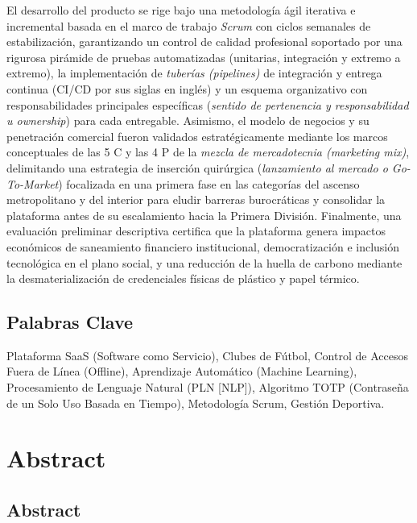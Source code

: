 El desarrollo del producto se rige bajo una metodología ágil iterativa e incremental basada en el marco de trabajo \textit{Scrum} con ciclos semanales de estabilización, garantizando un control de calidad profesional soportado por una rigurosa pirámide de pruebas automatizadas (unitarias, integración y extremo a extremo), la implementación de \textit{tuberías (pipelines)} de integración y entrega continua (CI/CD por sus siglas en inglés) y un esquema organizativo con responsabilidades principales específicas (\textit{sentido de pertenencia y responsabilidad u ownership}) para cada entregable. Asimismo, el modelo de negocios y su penetración comercial fueron validados estratégicamente mediante los marcos conceptuales de las 5 C y las 4 P de la \textit{mezcla de mercadotecnia (marketing mix)}, delimitando una estrategia de inserción quirúrgica (\textit{lanzamiento al mercado o Go-To-Market}) focalizada en una primera fase en las categorías del ascenso metropolitano y del interior para eludir barreras burocráticas y consolidar la plataforma antes de su escalamiento hacia la Primera División. Finalmente, una evaluación preliminar descriptiva certifica que la plataforma genera impactos económicos de saneamiento financiero institucional, democratización e inclusión tecnológica en el plano social, y una reducción de la huella de carbono mediante la desmaterialización de credenciales físicas de plástico y papel térmico.

\subsection{Palabras Clave}

Plataforma SaaS (Software como Servicio), Clubes de Fútbol, Control de Accesos Fuera de Línea (Offline), Aprendizaje Automático (Machine Learning), Procesamiento de Lenguaje Natural (PLN [NLP]), Algoritmo TOTP (Contraseña de un Solo Uso Basada en Tiempo), Metodología Scrum, Gestión Deportiva.

\newpage

\section{Abstract}

\subsection{Abstract}

